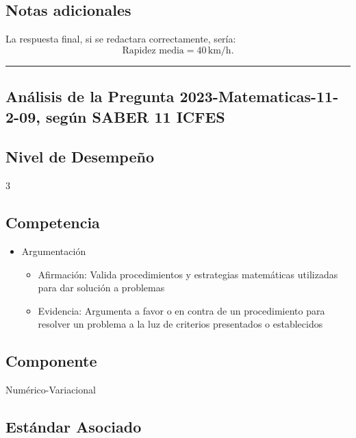 \documentclass[
]{article}
\providecommand{\tightlist}{%
  \setlength{\itemsep}{0pt}\setlength{\parskip}{0pt}}
\begin{document}
\subsection{Notas adicionales}\label{notas-adicionales}

La respuesta final, si se redactara correctamente, sería:\\
\[
\text{Rapidez media} = 40 \, \text{km/h}.
\]

\begin{center}\rule{0.5\linewidth}{0.5pt}\end{center}

\subsection{Análisis de la Pregunta 2023-Matematicas-11-2-09, según
SABER 11
ICFES}\label{anuxe1lisis-de-la-pregunta-2023-matematicas-11-2-09-seguxfan-saber-11-icfes}

\subsection{Nivel de Desempeño}\label{nivel-de-desempeuxf1o-1}

3

\subsection{Competencia}\label{competencia-1}

\begin{itemize}
\tightlist
\item
  Argumentación

  \begin{itemize}
  \tightlist
  \item
    Afirmación: Valida procedimientos y estrategias matemáticas
    utilizadas para dar solución a problemas
  \item
    Evidencia: Argumenta a favor o en contra de un procedimiento para
    resolver un problema a la luz de criterios presentados o
    establecidos
  \end{itemize}
\end{itemize}

\subsection{Componente}\label{componente-1}

Numérico-Variacional

\subsection{Estándar Asociado}\label{estuxe1ndar-asociado-2}
\end{document}
